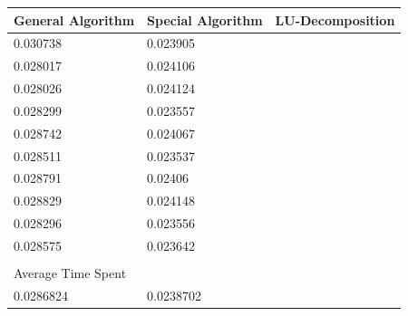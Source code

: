 \documentclass[a4paper,10pt]{article}
\begin{document}
\begin{table}[]  \label{fig:5}
\begin{tabular}{lll}
\hline
General Algorithm  & Special Algorithm & LU-Decomposition \\
\hline
0.030738           & 0.023905          &                  \\
0.028017           & 0.024106          &                  \\
0.028026           & 0.024124          &                  \\
0.028299           & 0.023557          &                  \\
0.028742           & 0.024067          &                  \\
0.028511           & 0.023537          &                  \\
0.028791           & 0.02406           &                  \\
0.028829           & 0.024148          &                  \\
0.028296           & 0.023556          &                  \\
0.028575           & 0.023642          &                  \\
                   &                   &                  \\\hline
Average Time Spent &                   &                  \\
\hline
0.0286824          & 0.0238702         &                 
\end{tabular}
\end{table}
\end{document}

